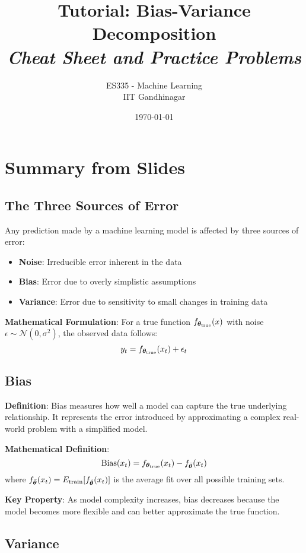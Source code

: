 \documentclass{article}
\title{\textbf{Tutorial: Bias-Variance Decomposition} \\ \textit{Cheat Sheet and Practice Problems}}
\author{ES335 - Machine Learning \\ IIT Gandhinagar}
\date{\today}
\begin{document}
\maketitle

\section{Summary from Slides}

\subsection{The Three Sources of Error}

Any prediction made by a machine learning model is affected by three sources of error:
\begin{itemize}
    \item \textbf{Noise}: Irreducible error inherent in the data
    \item \textbf{Bias}: Error due to overly simplistic assumptions
    \item \textbf{Variance}: Error due to sensitivity to small changes in training data
\end{itemize}

\textbf{Mathematical Formulation}: For a true function $f_{\boldsymbol{\theta}_{\text{true}}}(x)$ with noise $\epsilon \sim \mathcal{N}(0, \sigma^2)$, the observed data follows:
$$y_t = f_{\boldsymbol{\theta}_{\text{true}}}(x_t) + \epsilon_t$$

\subsection{Bias}

\textbf{Definition}: Bias measures how well a model can capture the true underlying relationship. It represents the error introduced by approximating a complex real-world problem with a simplified model.

\textbf{Mathematical Definition}:
$$\text{Bias}(x_t) = f_{\boldsymbol{\theta}_{\text{true}}}(x_t) - f_{\bar{\boldsymbol{\theta}}}(x_t)$$
where $f_{\bar{\boldsymbol{\theta}}}(x_t) = E_{\text{train}}[f_{\hat{\boldsymbol{\theta}}}(x_t)]$ is the average fit over all possible training sets.

\textbf{Key Property}: As model complexity increases, bias decreases because the model becomes more flexible and can better approximate the true function.

\subsection{Variance}
\end{document}
